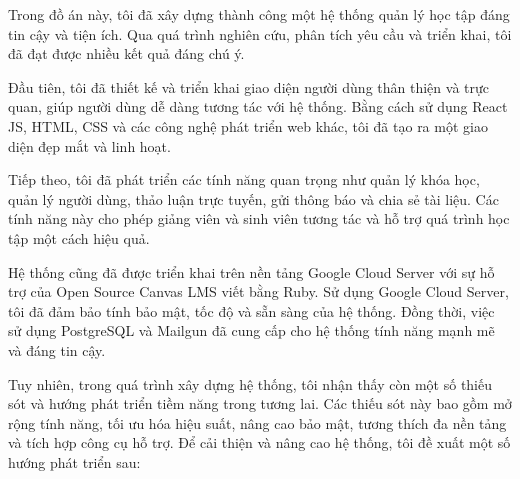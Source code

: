 \documentclass[../Thesis.tex]{subfiles}
\begin{document}
Trong đồ án này, tôi đã xây dựng thành công một hệ thống quản lý học tập đáng tin cậy và tiện ích. Qua quá trình nghiên cứu, phân tích yêu cầu và triển khai, tôi đã đạt được nhiều kết quả đáng chú ý.

Đầu tiên, tôi đã thiết kế và triển khai giao diện người dùng thân thiện và trực quan, giúp người dùng dễ dàng tương tác với hệ thống. Bằng cách sử dụng React JS, HTML, CSS và các công nghệ phát triển web khác, tôi đã tạo ra một giao diện đẹp mắt và linh hoạt.

Tiếp theo, tôi đã phát triển các tính năng quan trọng như quản lý khóa học, quản lý người dùng, thảo luận trực tuyến, gửi thông báo và chia sẻ tài liệu. Các tính năng này cho phép giảng viên và sinh viên tương tác và hỗ trợ quá trình học tập một cách hiệu quả.

Hệ thống cũng đã được triển khai trên nền tảng Google Cloud Server với sự hỗ trợ của Open Source Canvas LMS viết bằng Ruby. Sử dụng Google Cloud Server, tôi đã đảm bảo tính bảo mật, tốc độ và sẵn sàng của hệ thống. Đồng thời, việc sử dụng PostgreSQL và Mailgun đã cung cấp cho hệ thống tính năng mạnh mẽ và đáng tin cậy.

Tuy nhiên, trong quá trình xây dựng hệ thống, tôi nhận thấy còn một số thiếu sót và hướng phát triển tiềm năng trong tương lai. Các thiếu sót này bao gồm mở rộng tính năng, tối ưu hóa hiệu suất, nâng cao bảo mật, tương thích đa nền tảng và tích hợp công cụ hỗ trợ. Để cải thiện và nâng cao hệ thống, tôi đề xuất một số hướng phát triển sau:
\end{document}
